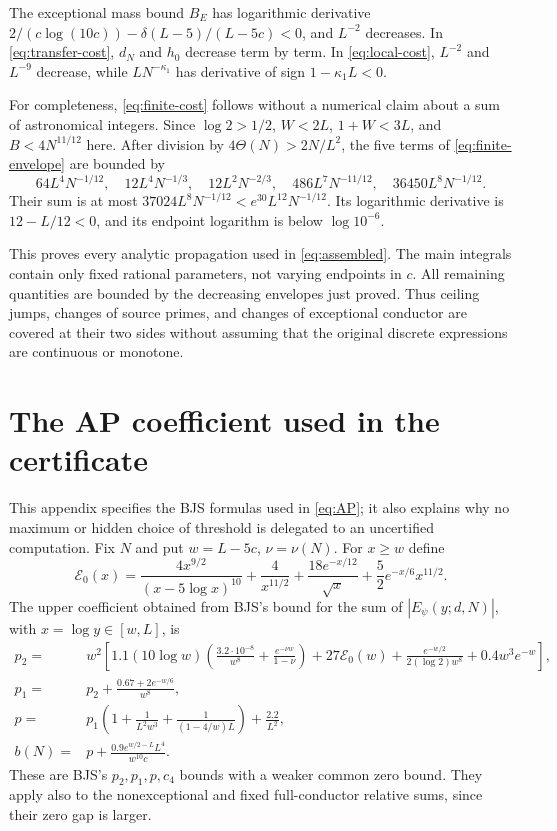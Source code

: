 \documentclass[11pt]{article}
\theoremstyle{definition}
\newcommand{\Th}{\Theta(N)}
\begin{document}
The exceptional mass bound $B_E$ has logarithmic derivative
$2/(c\log(10c))-\delta(L-5)/(L-5c)<0$, and $L^{-2}$ decreases.
In \eqref{eq:transfer-cost}, $d_N$ and $h_0$ decrease term by term.
In \eqref{eq:local-cost}, $L^{-2}$ and $L^{-9}$ decrease, while
$LN^{-\kappa_1}$ has derivative of sign $1-\kappa_1L<0$.

For completeness, \eqref{eq:finite-cost} follows without a numerical
claim about a sum of astronomical integers.  Since $\log2>1/2$,
$W<2L$, $1+W<3L$, and $B<4N^{11/12}$ here.
After division by $4\Th>2N/L^2$, the five terms of
\eqref{eq:finite-envelope} are bounded by
\[
 64L^4N^{-1/12},\quad 12L^4N^{-1/3},\quad12L^2N^{-2/3},
 \quad486L^7N^{-11/12},\quad36450L^8N^{-1/12}.
\]
Their sum is at most $37024L^8N^{-1/12}
 <e^{30}L^{12}N^{-1/12}$.  Its logarithmic derivative is
$12-L/12<0$, and its endpoint logarithm is below $\log10^{-6}$.

This proves every analytic propagation used in \eqref{eq:assembled}.
The main integrals contain only fixed rational parameters, not varying
endpoints in $c$.  All remaining quantities are bounded by the
decreasing envelopes just proved.  Thus ceiling jumps, changes of
source primes, and changes of exceptional conductor are covered at
their two sides without assuming that the original discrete
expressions are continuous or monotone.

\appendix
\section{The AP coefficient used in the certificate}\label{sec:APformula}

This appendix specifies the BJS formulas used in \eqref{eq:AP}; it also
explains why no maximum or hidden choice of threshold is delegated to
an uncertified computation.  Fix $N$ and put $w=L-5c$, $\nu=\nu(N)$.
For $x\ge w$ define
\[
 \mathcal E_0(x)=
 \frac{4x^{9/2}}{(x-5\log x)^{10}}+\frac4{x^{11/2}}
 +\frac{18e^{-x/12}}{\sqrt x}+\frac52 e^{-x/6}x^{11/2}.
\]
The upper coefficient obtained from BJS's bound for the sum of
$|E_\psi(y;d,N)|$, with $x=\log y\in[w,L]$, is
\begin{align*}
 p_2={}&w^2\left[
 1.1(10\log w)\left(\frac{3.2\cdot10^{-8}}{w^8}
                       +\frac{e^{-\nu w}}{1-\nu}\right)
 +27\mathcal E_0(w)
 +\frac{e^{-w/2}}{2(\log2)w^8}+0.4w^3e^{-w}\right],\\
 p_1={}&p_2+\frac{0.67+2e^{-w/6}}{w^8},\\
 p={}&p_1\left(1+\frac1{L^2w^3}
                 +\frac1{(1-4/w)L}\right)+\frac{2.2}{L^2},\\
 b(N)={}&p+\frac{0.9e^{w/2-L}L^4}{w^{10}c}.
\end{align*}
These are BJS's $p_2,p_1,p,c_4$ bounds with a weaker common zero
bound.  They apply also to the nonexceptional and fixed full-conductor
relative sums, since their zero gap is larger.
\end{document}
